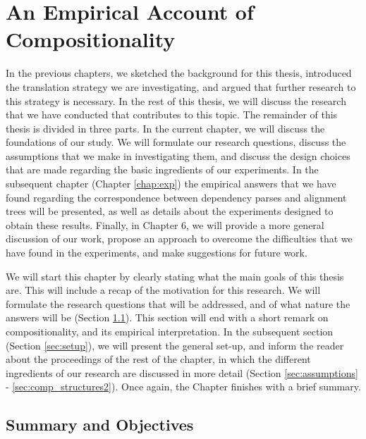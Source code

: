 %
%

\chapter{An Empirical Account of Compositionality}

In the previous chapters, we sketched the background for this thesis, introduced the translation strategy we are investigating, and argued that further research to this strategy is necessary. In the rest of this thesis, we will discuss the research that we have conducted that contributes to this topic. The remainder of this thesis is divided in three parts. In the current chapter, we will discuss the foundations of our study. We will formulate our research questions, discuss the assumptions that we make in investigating them, and discuss the design choices that are made regarding the basic ingredients of our experiments. In the subsequent chapter (Chapter \ref{chap:exp}) the empirical answers that we have found regarding the correspondence between dependency parses and alignment trees will be presented, as well as details about the experiments designed to obtain these results. Finally, in Chapter 6, we will provide a more general discussion of our work, propose an approach to overcome the difficulties that we have found in the experiments, and make suggestions for future work.

We will start this chapter by clearly stating what the main goals of this thesis are. This will include a recap of the motivation for this research. We will formulate the research questions that will be addressed, and of what nature the answers will be (Section \ref{sec:goals}). This section will end with a short remark on compositionality, and its empirical interpretation. In the subsequent section (Section \ref{sec:setup}), we will present the general set-up, and inform the reader about the proceedings of the rest of the chapter, in which the different ingredients of our research are discussed in more detail (Section \ref{sec:assumptions} - \ref{sec:comp_structures2}). Once again, the Chapter finishes with a brief summary.


\section{Summary and Objectives}
\label{sec:goals}

